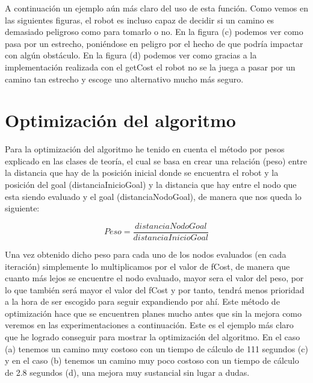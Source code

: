 \begin{figure}[H] %
	\centering
\end{figure}

A continuación un ejemplo aún más claro del uso de esta función. Como vemos en las siguientes figuras, el robot es incluso capaz de decidir si un camino es demasiado peligroso como para tomarlo o no. En la figura (c) podemos ver como pasa por un estrecho, poniéndose en peligro por el hecho de que podría impactar con algún obstáculo. En la figura (d) podemos ver como gracias a la implementación realizada con el getCost el robot no se la juega a pasar por un camino tan estrecho y escoge uno alternativo mucho más seguro.

\begin{figure}[H] %
	\centering
\end{figure}



\section{Optimización del algoritmo}

Para la optimización del algoritmo he tenido en cuenta el método por pesos explicado en las clases de teoría, el cual se basa en crear una relación (peso) entre la distancia que hay de la posición inicial donde se encuentra el robot y la posición del goal (distanciaInicioGoal) y la distancia que hay entre el nodo que esta siendo evaluado y el goal (distanciaNodoGoal), de manera que nos queda lo siguiente:

\[
	Peso = \frac{distanciaNodoGoal}{distanciaInicioGoal}
\]

Una vez obtenido dicho peso para cada uno de los nodos evaluados (en cada iteración) simplemente lo multiplicamos por el valor de fCost, de manera que cuanto más lejos se encuentre el nodo evaluado, mayor sera el valor del peso, por lo que también será mayor el valor del fCost y por tanto, tendrá menos prioridad a la hora de ser escogido para seguir expandiendo por ahí. Este método de optimización hace que se encuentren planes mucho antes que sin la mejora como veremos en las experimentaciones a continuación. Este es el ejemplo más claro que he logrado conseguir para mostrar la optimización del algoritmo. En el caso (a) tenemos un camino muy costoso con un tiempo de cálculo de 111 segundos (c) y en el caso (b) tenemos un camino muy poco costoso con un tiempo de cálculo de 2.8 segundos (d), una mejora muy sustancial sin lugar a dudas.


